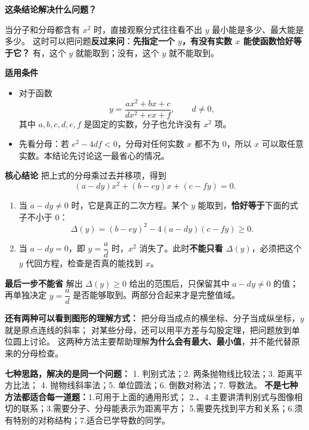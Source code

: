 \begin{statementbox}
  \textbf{\textcolor{CStatement}{这条结论解决什么问题？}}

  \medskip
  当分子和分母都含有 $x^2$ 时，直接观察分式往往看不出 $y$ 最小能是多少、最大能是多少。
  这时可以把问题\textbf{反过来问}：\textbf{先指定一个 $y$，有没有实数 $x$ 能使函数恰好等于它？}
  有，这个 $y$ 就能取到；没有，这个 $y$ 就不能取到。

  \medskip
  \begin{center}\end{center}
\end{statementbox}
\clearpage
\begin{statementbox}
\textbf{\textcolor{CStatement}{适用条件}}
  \begin{itemize}[leftmargin=*,itemsep=0.3em]
    \item 对于函数
    \[
      y=\frac{ax^2+bx+c}{dx^2+ex+f},\qquad d\ne0,
    \]
    其中 $a,b,c,d,e,f$ 是固定的实数，分子也允许没有 $x^2$ 项。
    \item 先看分母：若 $e^2-4df<0$，分母对任何实数 $x$ 都不为 $0$，所以 $x$ 可以取任意实数。本结论先讨论这一最省心的情况。
  \end{itemize}

  \medskip
  \textbf{\textcolor{CStatement}{核心结论}}
  把上式的分母乘过去并移项，得到
  \[
    \boxed{(a-dy)x^2+(b-ey)x+(c-fy)=0.}
  \]
  \begin{enumerate}[leftmargin=*,itemsep=0.4em]
    \item 当 $a-dy\ne0$ 时，它是真正的二次方程。某个 $y$ 能取到，\textbf{恰好等于}下面的式子不小于 $0$：
    \[
      \boxed{\Delta(y)=(b-ey)^2-4(a-dy)(c-fy)\ge0.}
    \]
    \item 当 $a-dy=0$，即 $y=\dfrac ad$ 时，$x^2$ 消失了。此时\textbf{不能只看 $\Delta(y)$}，必须把这个 $y$ 代回方程，检查是否真的能找到 $x$。
  \end{enumerate}

  \medskip
  \textbf{\textcolor{CStatement}{最后一步不能省}}
  解出 $\Delta(y)\ge0$ 给出的范围后，只保留其中 $a-dy\ne0$ 的值；再单独决定 $y=\dfrac ad$ 是否能够取到。两部分合起来才是完整值域。

  \medskip
  \textbf{还有两种可以看到图形的理解方式：}
  把分母当成点的横坐标、分子当成纵坐标，$y$ 就是原点连线的斜率；
  对某些分母，还可以用平方差与勾股定理，把问题放到单位圆上讨论。
  这两种方法主要帮助理解\textbf{为什么会有最大、最小值}，并不能代替原来的分母检查。

\medskip
  \textbf{七种思路，解决的是同一个问题：}
  1. 判别式法；2. 两条抛物线比较法；3. 距离平方比法；
  4. 抛物线斜率法；5. 单位圆法；6. 倒数对称法；7. 导数法。
  \textbf{不是七种方法都适合每一道题：}1.可用于上面的通用形式；
  2.、4.主要讲清判别式与图像相切的联系；3.需要分子、分母能表示为距离平方；
  5.需要先找到平方和关系；6.须有特别的对称结构；7.适合已学导数的同学。
\end{statementbox}
